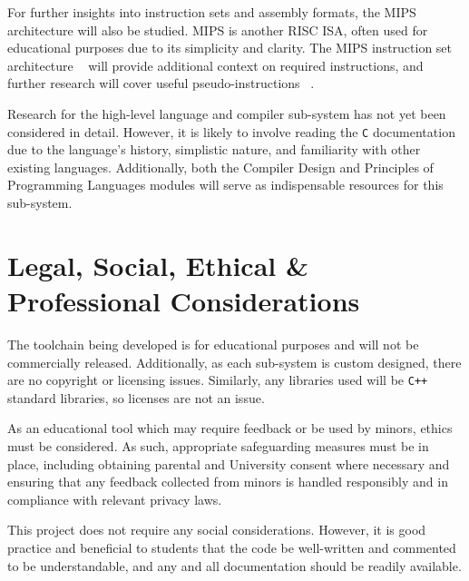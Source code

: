 \documentclass{article}
\begin{document}
    For further insights into instruction sets and assembly formats, the MIPS architecture will also be studied.
    MIPS is another RISC ISA, often used for educational purposes due to its simplicity and clarity.
    The MIPS instruction set architecture ~\cite{mips-isa} will provide additional context on required instructions, and further research will cover useful pseudo-instructions ~\cite{mips-pseudo-instructions}.

    Research for the high-level language and compiler sub-system has not yet been considered in detail.
    However, it is likely to involve reading the \texttt{C} documentation due to the language's history, simplistic nature, and familiarity with other existing languages.
    Additionally, both the Compiler Design and Principles of Programming Languages modules will serve as indispensable resources for this sub-system.

    \section{Legal, Social, Ethical \& Professional Considerations}\label{sec:considerations}

    The toolchain being developed is for educational purposes and will not be commercially released.
    Additionally, as each sub-system is custom designed, there are no copyright or licensing issues.
    Similarly, any libraries used will be \texttt{C++} standard libraries, so licenses are not an issue.

    As an educational tool which may require feedback or be used by minors, ethics must be considered.
    As such, appropriate safeguarding measures must be in place, including obtaining parental and University consent where necessary and ensuring that any feedback collected from minors is handled responsibly and in compliance with relevant privacy laws.

    This project does not require any social considerations.
    However, it is good practice and beneficial to students that the code be well-written and commented to be understandable, and any and all documentation should be readily available.

    \printbibliography
\end{document}
